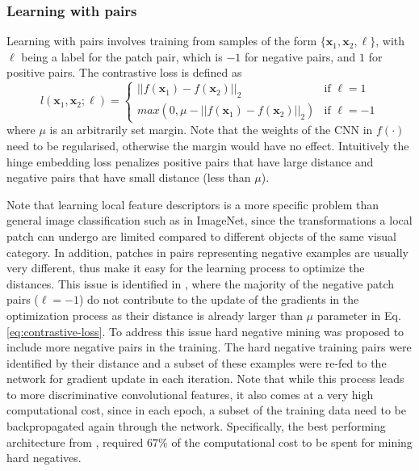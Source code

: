 \subsubsection{Learning with pairs}
Learning with pairs involves training from samples of the form
$\{\boldsymbol x_1,\boldsymbol x_2,\ell\}$, with  $\ell$ being 
 a label for the patch pair, which is $-1$
for negative pairs, and $1$ for positive pairs. The contrastive loss is defined as 
\begin{equation}
  \label{eq:contrastive-loss}
  l(\boldsymbol x_1,\boldsymbol x_2;\ell) =
\left\{
	\begin{array}{ll}
		||f(\boldsymbol x_1)-f(\boldsymbol x_2)||_2  & \mbox{if } \ell=1 \\
		max(0,\mu-||f(\boldsymbol x_1)-f(\boldsymbol x_2)||_2)  & \mbox{if } \ell=-1
	\end{array}
\right.
\end{equation}
where $\mu$ is an arbitrarily set margin. Note that the
weights of the CNN in $f(\cdot)$ need to be regularised, otherwise the margin would
have no effect. Intuitively the hinge embedding loss penalizes positive pairs
that have large distance and negative
pairs that have small distance (less than $\mu$).

Note that learning local feature descriptors is a more specific
problem than general image classification such as in ImageNet, since
the transformations a local patch can undergo are limited compared to
different objects of the same visual category. In addition, patches in
pairs representing negative examples are usually very different, thus
make it easy for the learning process to optimize the distances. This
issue is identified in \cite{simo2015deepdesc}, where the majority of
the negative patch pairs ($\ell=-1$) do not contribute to the update
of the gradients in the optimization process as their distance is
already larger than $\mu$ parameter in
Eq. \eqref{eq:contrastive-loss}. To address this issue hard negative
mining was proposed \cite{simo2015deepdesc} to include more negative
pairs in the training. The hard negative training pairs were
identified by their distance and a subset of these examples were
re-fed to the network for gradient update in each iteration. Note that
while this process leads to more discriminative convolutional
features, it also comes at a very high computational cost, since in
each epoch, a subset of the training data need to be backpropagated
again through the network. Specifically, the best performing
architecture from \cite{simo2015deepdesc}, required $67\%$ of the
computational cost to be spent for mining hard negatives.


